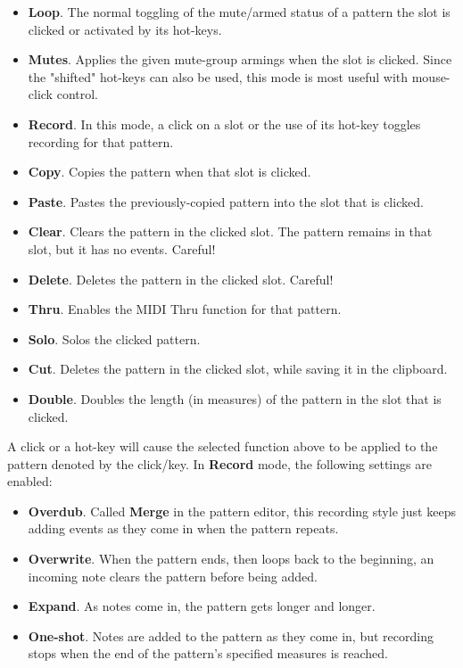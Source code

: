    \begin{itemize}
      \item \textbf{Loop}.
         The normal toggling of the mute/armed status of
         a pattern the slot is clicked or activated by its hot-keys.
      \item \textbf{Mutes}.
         Applies the given mute-group armings when
         the slot is clicked. Since the "shifted" hot-keys can also be used,
         this mode is most useful with mouse-click control.
      \item \textbf{Record}.
         In this mode, a click on a slot or the use of its hot-key toggles
         recording for that pattern.
      \item \textbf{Copy}.
         Copies the pattern when that slot is clicked.
      \item \textbf{Paste}.
         Pastes the previously-copied pattern into the slot
         that is clicked.
      \item \textbf{Clear}.
         Clears the pattern in the clicked slot.
         The pattern remains in that slot, but it has no events.
         Careful!
      \item \textbf{Delete}.
         Deletes the pattern in the clicked slot.
         Careful!
      \item \textbf{Thru}.
         Enables the MIDI Thru function for that pattern.
      \item \textbf{Solo}.
         Solos the clicked pattern.
      \item \textbf{Cut}.
         Deletes the pattern in the clicked slot, while saving it in
         the clipboard.
      \item \textbf{Double}.
         Doubles the length (in measures) of the pattern in the slot
         that is clicked.
   \end{itemize}

   A click or a hot-key will cause the selected function above to be applied to
   the pattern denoted by the click/key.
   In \textbf{Record} mode, the following settings are enabled:

   \begin{itemize}
      \item \textbf{Overdub}.
         Called \textbf{Merge} in the pattern editor, this recording
         style just keeps adding events as they come in when the
         pattern repeats.
      \item \textbf{Overwrite}.
         When the pattern ends, then loops back to the beginning,
         an incoming note clears the pattern before being added.
      \item \textbf{Expand}.
         As notes come in, the pattern gets longer and longer.
      \item \textbf{One-shot}.
         Notes are added to the pattern as they come in, but recording
         stops when the end of the pattern's specified measures is
         reached.
   \end{itemize}

